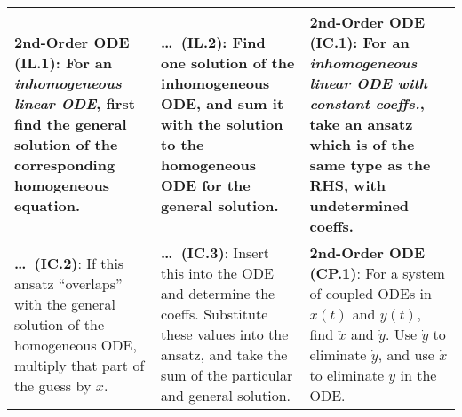 \begin{tabular}{|m{.31\linewidth}|m{.31\linewidth}|m{.31\linewidth}|}
\hline

\textbf{2nd-Order ODE (IL.1)}:
    For an \emph{inhomogeneous linear ODE}, first find the general solution of
    the corresponding homogeneous equation. &

\textbf{\ldots\ (IL.2)}:
    Find one solution of the inhomogeneous ODE, and sum it with the solution to
    the homogeneous ODE for the general solution. &

\textbf{2nd-Order ODE (IC.1)}:
    For an \emph{inhomogeneous linear ODE with constant coeffs.}, take an ansatz
    which is of the same type as the RHS, with undetermined coeffs. \\

\hline

\textbf{\ldots\ (IC.2)}:
    If this ansatz ``overlaps'' with the general solution of the homogeneous
    ODE, multiply that part of the guess by $ x $. &

\textbf{\ldots\ (IC.3)}:
    Insert this into the ODE and determine the coeffs. Substitute these values
    into the ansatz, and take the sum of the particular and general solution. &

\textbf{2nd-Order ODE (CP.1)}:
    For a system of coupled ODEs in $ x(t) $ and $ y(t) $, find $ \ddot{x} $ and
    $ \dot{y} $. Use $ \dot{y} $ to eliminate $ \dot{y} $, and use $ \dot{x} $
    to eliminate $ y $ in the ODE. \\

\hline
\end{tabular}
\clearpage

%
%

